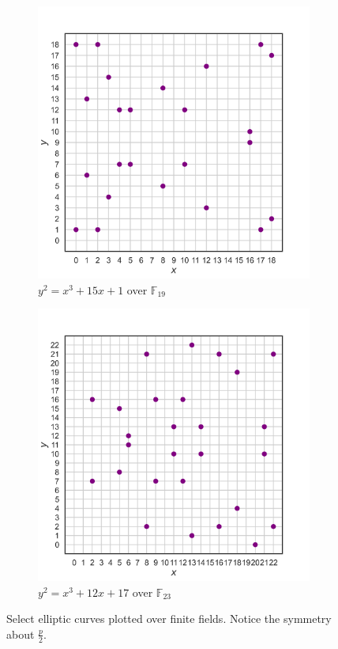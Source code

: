 \documentclass[11pt, a4paper]{report}
\newcommand{\field}{\mathbb{F}}
\begin{document}
\begin{figure}[ht]
\centering
\begin{subfigure}{0.49\textwidth}
\centering
\includegraphics[width = \textwidth]{krationalpoints19.png}
\caption{$y^2 = x^3 + 15x + 1$ over $\field_{19}$}
\label{fig:left}
\end{subfigure}
\begin{subfigure}{0.49\textwidth}
\centering
\includegraphics[width = \textwidth]{krationalpoints23.png}
\caption{$y^2 = x^3 + 12x + 17$ over $\field_{23}$}
\label{fig:right}
\end{subfigure}
\caption{Select elliptic curves plotted over finite fields. Notice the symmetry about $\frac{p}{2}$.}
\label{fig:combined}
\end{figure}
\end{document}
